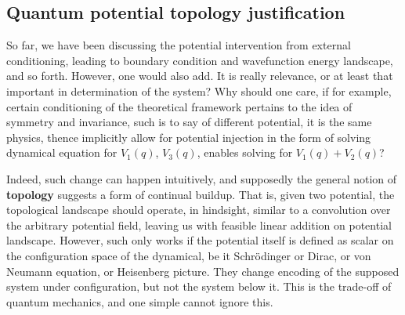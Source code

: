\subsection{Quantum potential topology justification}

So far, we have been discussing the potential intervention from external conditioning, leading to boundary condition and wavefunction energy landscape, and so forth. However, one would also add. It is really relevance, or at least that important in determination of the system? Why should one care, if for example, certain conditioning of the theoretical framework pertains to the idea of symmetry and invariance, such is to say of different potential, it is the same physics, thence implicitly allow for potential injection in the form of solving dynamical equation for $V_{1}(q)$, $V_{3}(q)$, enables solving for $V_{1}(q)+V_{2}(q)$? 

Indeed, such change can happen intuitively, and supposedly the general notion of \textbf{topology} suggests a form of continual buildup. That is, given two potential, the topological landscape should operate, in hindsight, similar to a convolution over the arbitrary potential field, leaving us with feasible linear addition on potential landscape. However, such only works if the potential itself is defined as scalar on the configuration space of the dynamical, be it Schrödinger or Dirac, or von Neumann equation, or Heisenberg picture. They change encoding of the supposed system under configuration, but not the system below it. This is the trade-off of quantum mechanics, and one simple cannot ignore this. 

